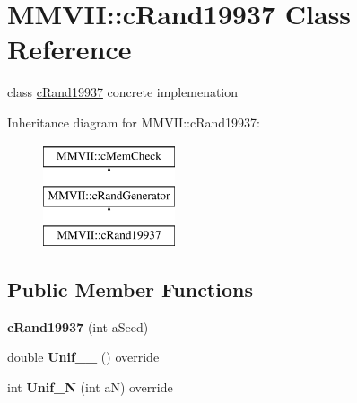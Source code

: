 \hypertarget{classMMVII_1_1cRand19937}{}\section{M\+M\+V\+II\+:\+:c\+Rand19937 Class Reference}
\label{classMMVII_1_1cRand19937}


class \hyperlink{classMMVII_1_1cRand19937}{c\+Rand19937} concrete implemenation  


Inheritance diagram for M\+M\+V\+II\+:\+:c\+Rand19937\+:\begin{figure}[H]
\begin{center}
\leavevmode
\includegraphics[height=3.000000cm]{classMMVII_1_1cRand19937}
\end{center}
\end{figure}
\subsection*{Public Member Functions}
\begin{DoxyCompactItemize}
\item 
{\bfseries c\+Rand19937} (int a\+Seed)\hypertarget{classMMVII_1_1cRand19937_af4641304be1606f0a952a9ffdaafe205}{}\label{classMMVII_1_1cRand19937_af4641304be1606f0a952a9ffdaafe205}

\item 
double {\bfseries Unif\+\_\+\_} () override\hypertarget{classMMVII_1_1cRand19937_a6774d94a7d3329d7c883b6e7358726d5}{}\label{classMMVII_1_1cRand19937_a6774d94a7d3329d7c883b6e7358726d5}

\item 
int {\bfseries Unif\+\_\+N} (int aN) override\hypertarget{classMMVII_1_1cRand19937_a9192231029dcf91120403f9923f4857b}{}\label{classMMVII_1_1cRand19937_a9192231029dcf91120403f9923f4857b}

\end{DoxyCompactItemize}
